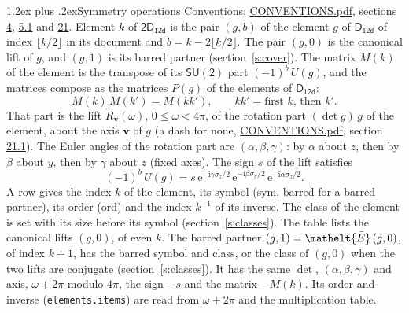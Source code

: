 \documentclass[10pt,a4paper]{article}
\makeatletter
\renewcommand\section{\@startsection{section}{1}{\z@}{-3ex plus -1ex minus -.2ex}%
  {1.2ex plus .2ex}{\normalfont\large\sffamily\bfseries\color{parttitle}}}
\numberwithin{equation}{section}
\newcommand{\eltfont}[1]{{\let\sigma\eltsigma\mathelt{#1}}}
\newcommand{\grp}[1]{\mathsf{#1}}
\newcommand{\elt}[1]{\eltfont{#1}}
\newcommand{\vv}{\mathbf{v}}
\newcommand{\iunit}{\mathrm{i}}
\newcommand{\expe}{\mathrm{e}}
\newcommand{\barred}[1]{\bar{#1}}
\newcommand{\lift}[1]{\tilde{#1}}
\newcommand{\pauli}[1]{\sigma_{#1}}
\makeatother
\begin{document}
\section{Symmetry operations}\label{s:elements}
Conventions: \href{../../CONVENTIONS.pdf}{CONVENTIONS.pdf}, sections \href{../../../rotation/CONVENTIONS.pdf\#conv.4}{4}, \href{../../../rotation/CONVENTIONS.pdf\#conv.5.1}{5.1} and \href{../../CONVENTIONS.pdf\#conv.21}{21}.
\leavevmode\label{n:index.element}\label{n:element.g}Element $k$ of $\grp{2D_{12d}}$ is the pair $(g, b)$ of the element $g$ of \href{../../../rotation/data/pdf/D12d.pdf}{$\grp{D_{12d}}$} of index $\lfloor k/2\rfloor$ in its document and $b = k - 2\lfloor k/2\rfloor$. The pair $(g, 0)$ is the canonical lift of $g$, and $(g, 1)$ is its barred partner (section~\ref{s:cover}). \label{n:matrix.element.pin}\label{n:matrix.element}The matrix $M(k)$ of the element is the transpose of its $\grp{SU(2)}$ part $(-1)^{b}\,U(g)$, and the matrices compose as the matrices $P(g)$ of the elements of $\grp{D_{12d}}$:
\begin{equation}\label{e:mprod}M(k)\,M(k') = M(kk'),\qquad kk' = \text{first } k\text{, then } k'.\end{equation}
\leavevmode\label{n:angle.omega}\label{n:vector.axis}\label{n:vector.pole}That part is the lift $\lift{R}_{\vv}(\omega)$, $0 \le \omega < 4\pi$, of the rotation part $(\det g)\,g$ of the element, about the axis $\vv$ of $g$ (a dash for none, \href{../../CONVENTIONS.pdf}{CONVENTIONS.pdf}, section \href{../../CONVENTIONS.pdf\#conv.21.1}{21.1}). \label{n:angle.euler.alpha}\label{n:angle.euler.beta}\label{n:angle.euler.gamma}\label{n:vector.coordinates}The Euler angles of the rotation part are $(\alpha,\beta,\gamma)$: by $\alpha$ about $z$, then by $\beta$ about $y$, then by $\gamma$ about $z$ (fixed axes). \label{n:local.euler.sign}The sign $s$ of the lift satisfies
\begin{equation}\label{e:euler}(-1)^{b}\,U(g) = s\,\expe^{-\iunit\gamma\pauli{z}/2}\,\expe^{-\iunit\beta\pauli{y}/2}\,\expe^{-\iunit\alpha\pauli{z}/2}.\end{equation}
\leavevmode\label{n:index.element.inverse}\label{n:head.sym}\label{n:head.ord}A row gives the index $k$ of the element, its symbol (sym, barred for a barred partner), its order (ord) and the index $k^{-1}$ of its inverse. \label{n:head.class}The class of the element is set with its size before its symbol (section~\ref{s:classes}).
The table lists the canonical lifts $(g, 0)$, of even $k$. The barred partner $(g, 1) = \elt{\barred{E}}\,(g, 0)$, of index $k + 1$, has the barred symbol and class, or the class of $(g, 0)$ when the two lifts are conjugate (section~\ref{s:classes}). It has the same $\det$, $(\alpha,\beta,\gamma)$ and axis, $\omega + 2\pi$ modulo $4\pi$, the sign $-s$ and the matrix $-M(k)$. Its order and inverse (\texttt{elements.items}) are read from $\omega + 2\pi$ and the multiplication table.
\end{document}
